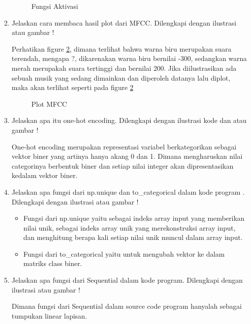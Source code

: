 \begin{enumerate}
\begin{figure}[!htbp]
		\caption{Fungsi Aktivasi}
		\label{1164081_3}
	\end{figure}	
\item Jelaskan cara membaca hasil plot dari MFCC. Dilengkapi dengan ilustrasi atau gambar !
\par
Perhatikan figure \ref{1164081_4}, dimana terlihat bahwa warna biru merupakan suara terendah, mengapa ?, dikarenakan warna biru bernilai -300, sedangkan warna merah merupakah suara tertinggi dan bernilai 200. Jika diilustrasikan ada sebuah musik yang sedang dimainkan dan diperoleh datanya lalu diplot, maka akan terlihat seperti pada figure \ref{1164081_4}
	\begin{figure}[!htbp]
		\caption{Plot MFCC}
		\label{1164081_4}
	\end{figure}	
\item Jelaskan apa itu one-hot encoding. Dilengkapi dengan ilustrasi kode dan atau gambar !
\par
One-hot encoding merupakan representasi variabel berkategorikan sebagai vektor biner yang artinya hanya akang 0 dan 1. Dimana mengharuskan nilai categorinya berbentuk biner dan setiap nilai integer akan dipresentasikan kedalam vektor biner.  
\item Jelaskan apa fungsi dari np.unique dan to\_categorical dalam kode program . Dilengkapi dengan ilustrasi atau gambar !
\par
\begin{itemize}
\item Fungsi dari np.unique yaitu sebagai indeks array input yang memberikan nilai unik, sebagai indeks array unik yang merekonstruksi array input, dan menghitung berapa kali setiap nilai unik muncul dalam array input. 
\item Fungsi dari to\_categorical yaitu untuk mengubah vektor ke dalam matriks class biner.
\end{itemize}
\item Jelaskan apa fungsi dari Sequential dalam kode program. Dilengkapi dengan ilustrasi atau gambar !
\par
Dimana fungsi dari Sequential dalam source code program hanyalah sebagai tumpukan linear lapisan.
\end{enumerate}
